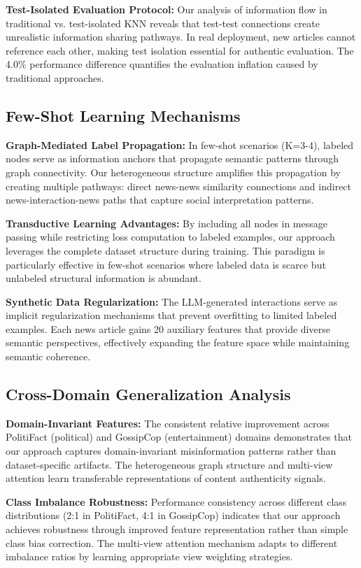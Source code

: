 \textbf{Test-Isolated Evaluation Protocol:} Our analysis of information flow in traditional vs. test-isolated KNN reveals that test-test connections create unrealistic information sharing pathways. In real deployment, new articles cannot reference each other, making test isolation essential for authentic evaluation. The 4.0\% performance difference quantifies the evaluation inflation caused by traditional approaches.

\subsection{Few-Shot Learning Mechanisms}

\textbf{Graph-Mediated Label Propagation:} In few-shot scenarios (K=3-4), labeled nodes serve as information anchors that propagate semantic patterns through graph connectivity. Our heterogeneous structure amplifies this propagation by creating multiple pathways: direct news-news similarity connections and indirect news-interaction-news paths that capture social interpretation patterns.

\textbf{Transductive Learning Advantages:} By including all nodes in message passing while restricting loss computation to labeled examples, our approach leverages the complete dataset structure during training. This paradigm is particularly effective in few-shot scenarios where labeled data is scarce but unlabeled structural information is abundant.

\textbf{Synthetic Data Regularization:} The LLM-generated interactions serve as implicit regularization mechanisms that prevent overfitting to limited labeled examples. Each news article gains 20 auxiliary features that provide diverse semantic perspectives, effectively expanding the feature space while maintaining semantic coherence.

\subsection{Cross-Domain Generalization Analysis}

\textbf{Domain-Invariant Features:} The consistent relative improvement across PolitiFact (political) and GossipCop (entertainment) domains demonstrates that our approach captures domain-invariant misinformation patterns rather than dataset-specific artifacts. The heterogeneous graph structure and multi-view attention learn transferable representations of content authenticity signals.

\textbf{Class Imbalance Robustness:} Performance consistency across different class distributions (2:1 in PolitiFact, 4:1 in GossipCop) indicates that our approach achieves robustness through improved feature representation rather than simple class bias correction. The multi-view attention mechanism adapts to different imbalance ratios by learning appropriate view weighting strategies.

